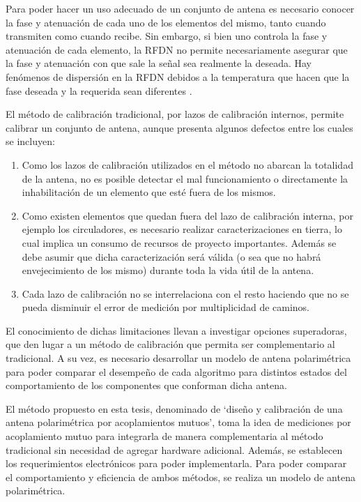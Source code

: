 Para poder hacer un uso adecuado de un conjunto de antena es necesario conocer la fase y atenuación de cada uno de los elementos
del mismo, tanto cuando transmiten como cuando recibe. Sin embargo, si bien uno controla la fase y atenuación de cada elemento,
la RFDN no permite necesariamente asegurar que la fase y atenuación con que sale la señal sea realmente la deseada. Hay 
fenómenos de dispersión en la RFDN debidos a la temperatura que hacen que la fase deseada y la requerida sean diferentes 
\cite{Keizer2011}.

El método de calibración tradicional, por lazos de calibración internos, permite calibrar un conjunto de antena, aunque
presenta algunos defectos entre los cuales se incluyen:

\begin{enumerate}
    \item Como los lazos de calibración utilizados en el método no abarcan la totalidad de la antena, no es posible detectar el
		mal funcionamiento o directamente la inhabilitación de un elemento que esté fuera de los mismos. 
    \item Como existen elementos que quedan fuera del lazo de calibración interna, por ejemplo los circuladores, es necesario
		realizar caracterizaciones en tierra, lo cual implica un consumo de recursos de proyecto importantes. Además se debe 
		asumir que dicha caracterización será válida (o sea que no habrá envejecimiento de los mismo) durante toda la vida útil
		de la antena.
    \item Cada lazo de calibración no se interrelaciona con el resto haciendo que no se pueda disminuir el error de medición por
		multiplicidad de caminos.
\end{enumerate}

El conocimiento de dichas limitaciones llevan a investigar opciones superadoras, que den lugar a un método de calibración que 
permita ser complementario al tradicional. A su vez, es necesario desarrollar un modelo de antena polarimétrica para poder 
comparar el desempeño de cada algoritmo para distintos estados del comportamiento de los componentes que conforman dicha antena.

El método propuesto en esta tesis, denominado de \enquote*{diseño y calibración de una antena polarimétrica por 
acoplamientos mutuos}, toma la idea de mediciones por acoplamiento mutuo \cite{Agrawal2003}\cite{Shipley2000} \cite{Aumann1989}
\cite{Chen2012} para integrarla de manera complementaria al método tradicional sin necesidad de agregar hardware adicional. 
Además, se establecen los requerimientos electrónicos para poder implementarla. Para poder comparar el comportamiento y 
eficiencia de ambos métodos, se realiza un modelo de antena polarimétrica.



